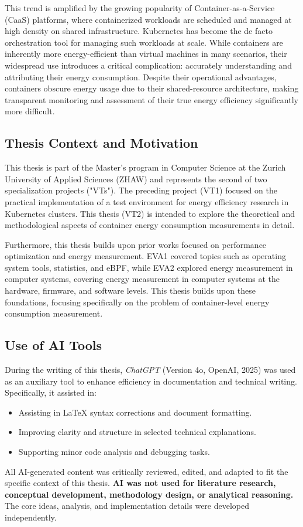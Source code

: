 This trend is amplified by the growing popularity of Container-as-a-Service (CaaS) platforms, where containerized workloads are scheduled and managed at high density on shared infrastructure. Kubernetes has become the de facto orchestration tool for managing such workloads at scale. While containers are inherently more energy-efficient than virtual machines in many scenarios\parencite{Morabito2015}, their widespread use introduces a critical complication: accurately understanding and attributing their energy consumption. Despite their operational advantages, containers obscure energy usage due to their shared-resource architecture, making transparent monitoring and assessment of their true energy efficiency significantly more difficult.

\subsection{Thesis Context and Motivation}

This thesis is part of the Master's program in Computer Science at the Zurich University of Applied Sciences (ZHAW) and represents the second of two specialization projects ("VTs"). The preceding project (VT1) focused on the practical implementation of a test environment for energy efficiency research in Kubernetes clusters. This thesis (VT2) is intended to explore the theoretical and methodological aspects of container energy consumption measurements in detail.

Furthermore, this thesis builds upon prior works focused on performance optimization and energy measurement. EVA1 covered topics such as operating system tools, statistics, and eBPF, while EVA2 explored energy measurement in computer systems, covering energy measurement in computer systems at the hardware, firmware, and software levels. This thesis builds upon these foundations, focusing specifically on the problem of container-level energy consumption measurement.

\subsection{Use of AI Tools}
During the writing of this thesis, \textit{ChatGPT}\parencite{OpenAI_ChatGPT_2025} (Version 4o, OpenAI, 2025) was used as an auxiliary tool to enhance efficiency in documentation and technical writing. Specifically, it assisted in:
\begin{itemize}
\item Assisting in LaTeX syntax corrections and document formatting.
\item Improving clarity and structure in selected technical explanations.
\item Supporting minor code analysis and debugging tasks.
\end{itemize}
All AI-generated content was critically reviewed, edited, and adapted to fit the specific context of this thesis. \textbf{AI was not used for literature research, conceptual development, methodology design, or analytical reasoning.} The core ideas, analysis, and implementation details were developed independently.

